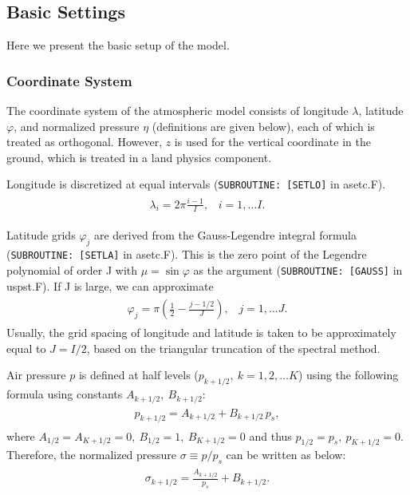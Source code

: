 \hypertarget{basic-settings}{%
\subsection{Basic Settings}\label{basic-settings}}

Here we present the basic setup of the model.

\hypertarget{coordinate-system}{%
\subsubsection{Coordinate System}\label{coordinate-system}}

The coordinate system of the atmospheric model consists of longitude \(\lambda\), latitude \(\varphi\), and normalized pressure \(\eta\) (definitions are given below), each of which is treated as
orthogonal. However, \(z\) is used for the vertical coordinate in the ground, which is treated in a land physics component.

Longitude is discretized at equal intervals (\texttt{SUBROUTINE:~{[}SETLO{]}} in asetc.F). \begin{eqnarray}\begin{aligned}
  \lambda_i = 2 \pi \frac{i-1}{I},  \;\;\; i = 1, \ldots I.\end{aligned}\end{eqnarray}

Latitude grids \(\varphi_j\) are derived from the Gauss-Legendre integral formula (\texttt{SUBROUTINE:~{[}SETLA{]}} in asetc.F). This is the zero point of the Legendre polynomial of order J with
\(\mu = \sin \varphi\) as the argument (\texttt{SUBROUTINE:~{[}GAUSS{]}} in uspst.F). If J is large, we can approximate \begin{eqnarray}\begin{aligned}
  \varphi_j =  \pi \left( \frac{1}{2}- \frac{j-1/2}{J} \right), \;\;\; j = 1, \ldots J.\end{aligned}\end{eqnarray} Usually, the grid spacing of longitude and latitude is taken to be approximately equal to
\(J = I/2\), based on the triangular truncation of the spectral method.

Air pressure \(p\) is defined at half levels (\(p_{k+1/2},\ k = 1, 2, \ldots K\)) using the following formula using constants \(A_{k+1/2},\ B_{k+1/2}\): \begin{eqnarray}\begin{aligned}
p_{k+1/2} = A_{k+1/2} +B_{k+1/2}\,p_s,\end{aligned}\end{eqnarray} where \(A_{1/2}=A_{K+1/2}=0,\ B_{1/2}=1,\ B_{K+1/2}=0\) and thus \(p_{1/2}=p_s,\ p_{K+1/2}=0\). Therefore, the normalized pressure
\(\sigma\equiv p/p_s\) can be written as below: \begin{eqnarray}\begin{aligned}
\sigma_{k+1/2} = \frac{A_{k+1/2}}{p_s} +B_{k+1/2}.\end{aligned}\end{eqnarray}

